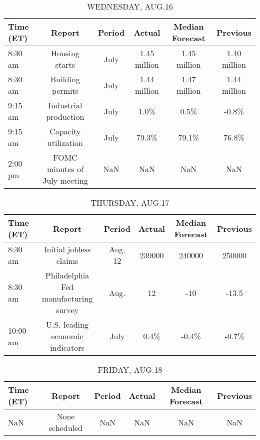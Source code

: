 \documentclass{article}%
\begin{document}
\begin{table}[htbp]%
\caption{WEDNESDAY, AUG.16}%
\centering%
\begin{adjustbox}{width=1\textwidth}%
\begin{tabular}{lccccc}
\toprule
Time (ET) &                       Report & Period &       Actual & Median Forecast &     Previous \\
\midrule
  8:30 am &               Housing starts &   July & 1.45 million &    1.45 million & 1.40 million \\
  8:30 am &             Building permits &   July & 1.44 million &    1.47 million & 1.44 million \\
  9:15 am &        Industrial production &   July &         1.0\% &            0.5\% &        -0.8\% \\
  9:15 am &         Capacity utilization &   July &        79.3\% &           79.1\% &        76.8\% \\
  2:00 pm & FOMC minutes of July meeting &    NaN &          NaN &             NaN &          NaN \\
\bottomrule
\end{tabular}
%
\end{adjustbox}%
\end{table}

%


\begin{table}[htbp]%
\caption{THURSDAY, AUG.17}%
\centering%
\begin{adjustbox}{width=1\textwidth}%
\begin{tabular}{lccccc}
\toprule
Time (ET) &                                Report &  Period & Actual & Median Forecast & Previous \\
\midrule
  8:30 am &                Initial jobless claims & Aug. 12 & 239000 &          240000 &   250000 \\
  8:30 am & Philadelphia Fed manufacturing survey &    Aug. &     12 &             -10 &    -13.5 \\
 10:00 am &      U.S. leading economic indicators &    July &   0.4\% &           -0.4\% &    -0.7\% \\
\bottomrule
\end{tabular}
%
\end{adjustbox}%
\end{table}

%


\begin{table}[htbp]%
\caption{FRIDAY, AUG.18}%
\centering%
\begin{adjustbox}{width=1\textwidth}%
\begin{tabular}{lccccc}
\toprule
Time (ET) &         Report & Period & Actual & Median Forecast & Previous \\
\midrule
      NaN & None scheduled &    NaN &    NaN &             NaN &      NaN \\
\bottomrule
\end{tabular}
%
\end{adjustbox}%
\end{table}
\end{document}
